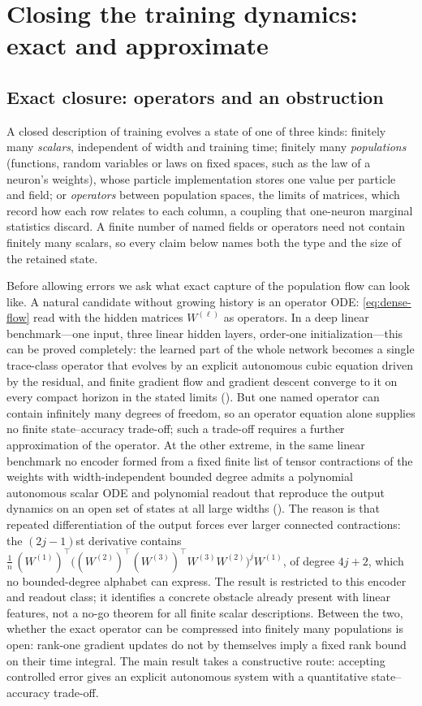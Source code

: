 \documentclass[11pt]{article}
\theoremstyle{definition}
\theoremstyle{remark}
\begin{document}
\section{Closing the training dynamics: exact and approximate}
\label{sec:memory}

\subsection{Exact closure: operators and an obstruction}
\label{sec:notions}

A closed description of training evolves a state of one of three kinds: finitely
many \emph{scalars}, independent of width and training time; finitely many
\emph{populations} (functions, random variables or laws on fixed spaces, such as
the law of a neuron's weights), whose particle implementation stores one value
per particle and field; or \emph{operators} between population spaces, the
limits of matrices, which record how each row relates to each column, a
coupling that one-neuron marginal statistics discard.  A finite number of named
fields or operators need not contain finitely many scalars, so every claim below
names both the type and the size of the retained state.

Before allowing errors we ask what exact capture of the population flow can look
like.  A natural candidate without growing history is an operator ODE:
\eqref{eq:dense-flow} read with the hidden matrices $W^{(\ell)}$ as operators.
In a deep linear benchmark---one input, three linear hidden layers, order-one
initialization---this can be proved completely: the learned part of the whole
network becomes a single trace-class operator that evolves by an explicit
autonomous cubic equation driven by the residual, and finite gradient flow and
gradient descent converge to it on every compact horizon in the stated limits
().  But one named operator can contain infinitely many degrees
of freedom, so an operator equation alone supplies no finite state--accuracy
trade-off; such a trade-off requires a further approximation of the operator.
At the other extreme, in the same linear benchmark no encoder formed from a
fixed finite list of tensor contractions of the weights with width-independent
bounded degree admits a polynomial autonomous scalar ODE and polynomial readout
that reproduce the output dynamics on an open set of states at all large widths
().  The reason is that repeated differentiation of the output
forces ever larger connected contractions: the $(2j-1)$st derivative contains
$\frac1n\,(W^{(1)})^\top\bigl((W^{(2)})^\top(W^{(3)})^\top W^{(3)}W^{(2)}\bigr)^{j}W^{(1)}$,
of degree $4j+2$, which no bounded-degree alphabet can express.  The result is
restricted to this encoder and readout class; it identifies a concrete obstacle
already present with linear features, not a no-go theorem for all finite scalar
descriptions.  Between the two, whether the exact operator can be compressed
into finitely many populations is open: rank-one gradient updates do not by
themselves imply a fixed rank bound on their time integral.  The main result
takes a constructive route: accepting controlled error gives an explicit
autonomous system with a quantitative state--accuracy trade-off.
\end{document}
